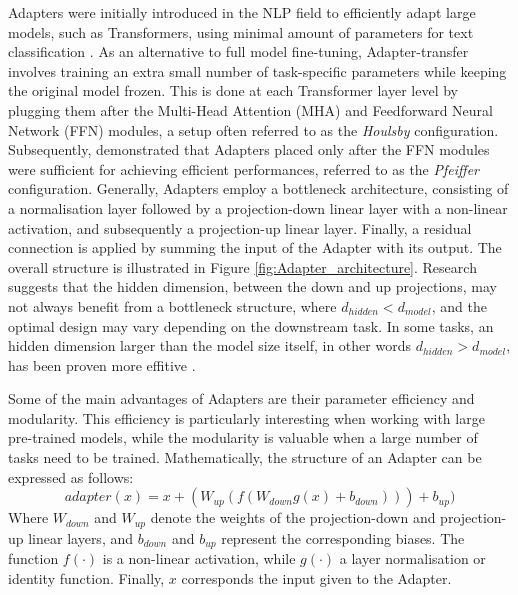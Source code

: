 Adapters were initially introduced in the NLP field to efficiently adapt large models, such as Transformers, using minimal amount of parameters for text classification \cite{houlsby}. As an alternative to full model fine-tuning, Adapter-transfer involves training an extra small number of task-specific parameters while keeping the original model frozen. This is done at each Transformer layer level by plugging them after the Multi-Head Attention (MHA) and Feedforward Neural Network (FFN) modules, a setup often referred to as the \textit{Houlsby} configuration. Subsequently, \cite{pfeiffer} demonstrated that Adapters placed only after the FFN modules were sufficient for achieving efficient performances, referred to as the \textit{Pfeiffer} configuration. Generally, Adapters employ a bottleneck architecture, consisting of a normalisation layer followed by a projection-down linear layer with a non-linear activation, and subsequently a projection-up linear layer. Finally, a residual connection is applied by summing the input of the Adapter with its output. The overall structure is illustrated in Figure \ref{fig:Adapter_architecture}. Research suggests that the hidden dimension, between the down and up projections, may not always benefit from a bottleneck structure, where $d_{hidden} < d_{model}$, and the optimal design may vary depending on the downstream task. In some tasks, an hidden dimension larger than the model size itself, in other words $d_{hidden} > d_{model}$, has been proven more effitive \cite{fan2022draft}.

Some of the main advantages of Adapters are their parameter efficiency and modularity. This efficiency is particularly interesting when working with large pre-trained models, while the modularity is valuable when a large number of tasks need to be trained.
Mathematically, the structure of an Adapter can be expressed as follows:
\begin{equation}
    adapter(x) = x + (W_{up}(f(W_{down}g(x)+b_{down})))+ b_{up})
\end{equation}
Where $W_{down}$ and $W_{up}$ denote the weights of the projection-down and projection-up linear layers, and $b_{down}$ and $b_{up}$ represent the corresponding biases. The function $f(\cdot)$ is a non-linear activation, while $g(\cdot)$ a layer normalisation or identity function. Finally, $x$ corresponds the input given to the Adapter.

